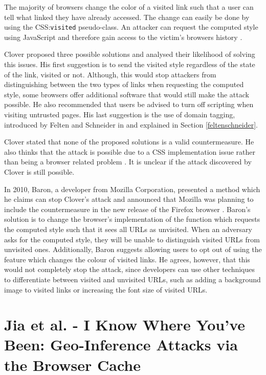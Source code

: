\documentclass[10pt,a4paper,twoside]{book}
\begin{document}
The majority of browsers change the color of a visited link such that a user can tell what linked they have already accessed. The change can easily be done by using the CSS:\texttt{visited} pseudo-class. An attacker can request the computed style using JavaScript and therefore gain access to the victim's browsers history \cite{cssvisited}.

Clover proposed three possible solutions and analysed their likelihood of solving this issues. His first suggestion is to send the visited style regardless of the state of the link, visited or not. Although, this would stop attackers from distinguishing between the two types of links when requesting the computed style, some browsers offer additional software that would still make the attack possible. He also recommended that users be advised to turn off scripting when visiting untrusted pages. His last suggestion is the use of domain tagging, introduced by Felten and Schneider in \cite{felten2000timing} and explained in Section \ref{feltenschneider}.

Clover stated that none of the proposed solutions is a valid countermeasure. He also thinks that the attack is possible due to a CSS implementation issue rather than being a browser related problem \cite{cssvisited}. It is unclear if the attack discovered by Clover is still possible. 

In 2010, Baron, a developer from Mozilla Corporation, presented a method which he claims can stop Clover's attack and announced that Mozilla was planning to include the countermeasure in the new release of the Firefox browser \cite{fixedcssprivacy}. Baron's solution is to change the browser's implementation of the function which requests the computed style such that it sees all URLs as unvisited. When an adversary asks for the computed style, they will be unable to distinguish visited URLs from unvisited ones. Additionally, Baron suggests allowing users to opt out of using the feature which changes the colour of visited links. He agrees, however, that this would not completely stop the attack, since developers can use other techniques to differentiate between visited and unvisited URLs, such as adding a background image to visited links or increasing the font size of visited URLs.

\section{Jia et al. - I Know Where You've Been: Geo-Inference Attacks via the Browser Cache}
\end{document}
